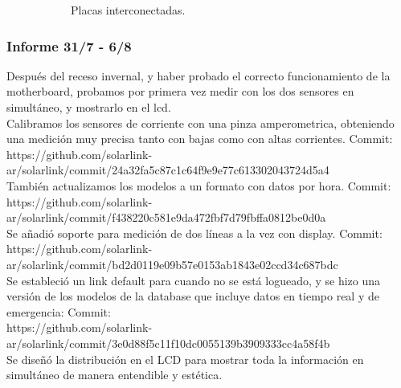 \begin{figure}[H]
\begin{subfigure}{0.5\textwidth}
\caption{Placas interconectadas.}
\end{subfigure}

\caption{}
\end{figure}


\subsubsection{Informe 31/7 - 6/8}

Después del receso invernal, y haber probado el correcto funcionamiento de la motherboard, probamos por primera vez medir con los dos sensores en simultáneo, y mostrarlo en el lcd. \\

Calibramos los sensores de corriente con una pinza amperometrica, obteniendo una medición muy precisa tanto con bajas como con altas corrientes. Commit:\\

https://github.com/solarlink-\\ar/solarlink/commit/24a32fa5c87c1c64f9e9e77c613302043724d5a4\\

También actualizamos los modelos a un formato con datos por hora. Commit:\\
https://github.com/solarlink-\\ar/solarlink/commit/f438220c581e9da472fbf7d79fbffa0812be0d0a\\

Se añadió soporte para medición de dos líneas a la vez con display. Commit:\\
https://github.com/solarlink-\\ar/solarlink/commit/bd2d0119e09b57e0153ab1843e02ccd34c687bdc\\

Se estableció un link default para cuando no se está logueado, y se hizo una versión de los modelos de la database que incluye datos en tiempo real y de emergencia: Commit:\\
https://github.com/solarlink-\\ar/solarlink/commit/3e0d88f5c11f10dc0055139b3909333cc4a58f4b\\

Se diseñó la distribución en el LCD para mostrar toda la información en simultáneo de manera entendible y estética.\\

